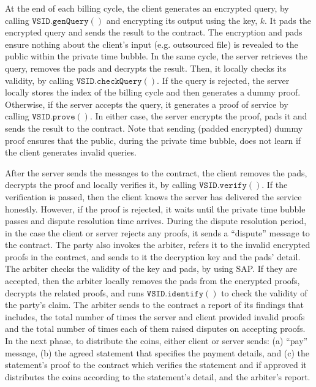  
 
At the end of each billing cycle, the client generates an encrypted query, by calling $\mathtt{VSID.genQuery}()$ and encrypting its output using the key, $k$. It pads the encrypted query and  sends the result  to the contract. The encryption and pads ensure  nothing about the client's input (e.g. outsourced file) is revealed to the public within the private time bubble.  In the same cycle, the server retrieves the query, removes the pads and decrypts the result. Then, it locally checks its validity, by calling $\mathtt{VSID.checkQuery}()$. If the query is rejected, the server locally stores the index of the billing cycle and then  generates a dummy proof.  Otherwise, if the server accepts the query, it generates a proof of service by calling $\mathtt{VSID.prove}()$. In either case, the server encrypts the proof, pads it and sends the result to the contract. Note that sending (padded encrypted) dummy proof ensures that the public, during the private time bubble, does not learn if the client generates invalid queries. 

 After the server sends the messages to the contract, the client removes the pads, decrypts the proof and locally verifies it, by calling $\mathtt{VSID.verify}()$. If the verification is passed, then the client knows the server has delivered the service honestly. However, if the proof is rejected,  it waits until the private time bubble passes and dispute resolution time arrives. During the dispute resolution period, in the case the client or server  rejects any proofs, it sends a ``dispute'' message to the contract. The party also invokes the arbiter,  refers it to the invalid encrypted proofs in the contract, and  sends to it the decryption key and the pads' detail. The arbiter checks the validity of the key and pads, by using SAP. If they are accepted,  then the arbiter locally removes the pads from the encrypted proofs,   decrypts the related proofs, and runs $\mathtt{VSID.identify}()$ to check the validity of the party's claim. The arbiter sends to the contract a report of its findings that includes,  the total number of times  the server and client provided invalid proofs and the total number of times each of them raised disputes on accepting proofs. In the next phase, to distribute the coins, either client or server  sends: (a) ``pay'' message, (b) the agreed statement that specifies the payment details, and (c) the statement's proof to the contract which verifies the statement and if approved it distributes the coins according to the statement's detail, and the arbiter's report. 

